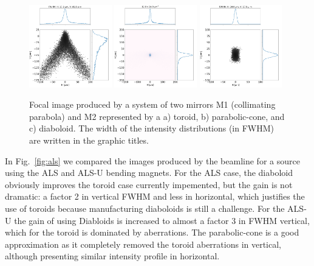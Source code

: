 \documentclass{iucr}              %
\begin{document}
\begin{figure}
\includegraphics[width=0.32\textwidth]{figures/alsu_toroid.png}
\includegraphics[width=0.32\textwidth]{figures/alsu_parabolic-cone.png}
\includegraphics[width=0.32\textwidth]{figures/alsu_diaboloid.png}
\caption{Focal image produced by a system of two mirrors M1 (collimating parabola) and M2 represented by a a) toroid, b) parabolic-cone, and c) diaboloid. The width of the intensity distributions (in FWHM) are written in the graphic titles. 
}
\end{figure}

In Fig.~\ref{fig:als} we compared the images produced by the beamline for a source using the ALS and ALS-U bending magnets. For the ALS case, the diaboloid obviously improves the toroid case currently impemented, but the gain is not dramatic: a factor 2 in vertical FWHM and less in horizontal, which justifies the use of toroids because manufacturing diaboloids is still a challenge. For the ALS-U the gain of using Diabloids is increased to almost a factor 3 in FWHM vertical, which for the toroid is dominated by aberrations. The parabolic-cone is a good approximation as it completely removed the toroid aberrations in vertical, although presenting similar intensity profile in horizontal.
\end{document}
